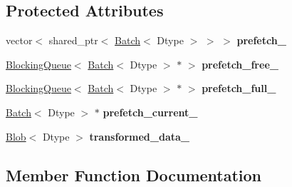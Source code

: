\subsection*{Protected Attributes}
\begin{DoxyCompactItemize}
\item 
\mbox{\label{classcaffe_1_1_base_prefetching_data_layer_a59112876a1e967a4bfe88843335be115}} 
vector$<$ shared\+\_\+ptr$<$ \mbox{\hyperlink{classcaffe_1_1_batch}{Batch}}$<$ Dtype $>$ $>$ $>$ {\bfseries prefetch\+\_\+}
\item 
\mbox{\label{classcaffe_1_1_base_prefetching_data_layer_a6cd3c855a471d5f9ceee362ddb070e4a}} 
\mbox{\hyperlink{classcaffe_1_1_blocking_queue}{Blocking\+Queue}}$<$ \mbox{\hyperlink{classcaffe_1_1_batch}{Batch}}$<$ Dtype $>$ $\ast$ $>$ {\bfseries prefetch\+\_\+free\+\_\+}
\item 
\mbox{\label{classcaffe_1_1_base_prefetching_data_layer_a33ec26b48264abad81cf32348261005d}} 
\mbox{\hyperlink{classcaffe_1_1_blocking_queue}{Blocking\+Queue}}$<$ \mbox{\hyperlink{classcaffe_1_1_batch}{Batch}}$<$ Dtype $>$ $\ast$ $>$ {\bfseries prefetch\+\_\+full\+\_\+}
\item 
\mbox{\label{classcaffe_1_1_base_prefetching_data_layer_a15bcf69b1ed0e5630183878a2b5bc9b2}} 
\mbox{\hyperlink{classcaffe_1_1_batch}{Batch}}$<$ Dtype $>$ $\ast$ {\bfseries prefetch\+\_\+current\+\_\+}
\item 
\mbox{\label{classcaffe_1_1_base_prefetching_data_layer_afa4fe0070c083be427ecc600534bc61e}} 
\mbox{\hyperlink{classcaffe_1_1_blob}{Blob}}$<$ Dtype $>$ {\bfseries transformed\+\_\+data\+\_\+}
\end{DoxyCompactItemize}


\subsection{Member Function Documentation}
\mbox{\label{classcaffe_1_1_base_prefetching_data_layer_ad3b7914abaa6d46c148864c0e28204ad}} 
